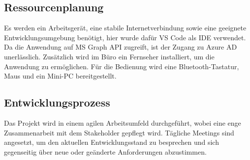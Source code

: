 \subsection{Ressourcenplanung}
\label{sec:Ressourcenplanung}

Es werden ein Arbeitsgerät, eine stabile Internetverbindung sowie eine geeignete Entwicklungsumgebung benötigt, hier wurde dafür \ac{VS} Code als \ac{IDE} verwendet.
Da die Anwendung auf \ac{MS} Graph \ac{API} zugreift, ist der Zugang zu Azure \ac{AD} unerlässlich.
Zusätzlich wird im Büro ein Fernseher installiert, um die Anwendung zu ermöglichen.
Für die Bedienung wird eine Bluetooth-Tastatur, Maus und ein Mini-PC bereitgestellt.


\subsection{Entwicklungsprozess}
\label{sec:Entwicklungsprozess}
Das Projekt wird in einem agilen Arbeitsumfeld durchgeführt, wobei eine enge Zusammenarbeit mit dem Stakeholder gepflegt wird.
Tägliche Meetings sind angesetzt, um den aktuellen Entwicklungsstand zu besprechen und sich gegenseitig über neue oder geänderte Anforderungen abzustimmen.